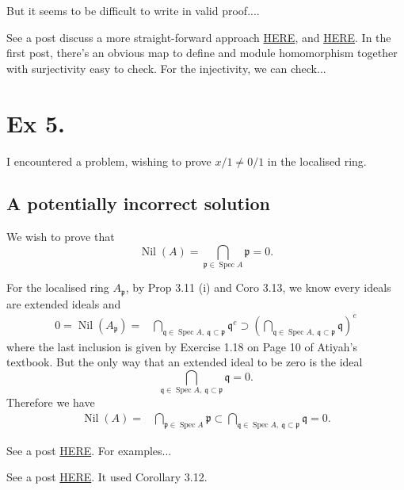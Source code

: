 But it seems to be difficult to write in valid proof....

See a post discuss a more straight-forward approach \href{https://math.stackexchange.com/questions/375454/s-1b-and-t-1b-isomorphic-for-t-fs}{HERE}, and \href{https://math.stackexchange.com/questions/1459441/fa-to-b-ring-homomorphism-s-multiplicatively-closed-subset-of-a-what-does}{HERE}. In the first post, there's an obvious map to define and module homomorphism together with surjectivity easy to check. For the injectivity, we can check... 

\section{Ex 5.}

I encountered a problem, wishing to prove $x/1\neq 0/1$ in the localised ring.


\subsection{A potentially incorrect solution}

We wish to prove that 
$$\operatorname{Nil}(A)=\bigcap_{\mathfrak p\in\operatorname{Spec}A}\mathfrak p=0.$$

For the localised ring $A_{\mathfrak p}$, by Prop 3.11 (i) and Coro 3.13, we know every ideals are extended ideals and 
\begin{align*}
	0=\operatorname{Nil}(A_{\mathfrak p}) =& \bigcap_{\mathfrak q\in\operatorname{Spec}A,~ \mathfrak q\subset \mathfrak p} \mathfrak q^{e}\supset \left(\bigcap_{\mathfrak q\in\operatorname{Spec}A,~ \mathfrak q\subset \mathfrak p} \mathfrak q\right)^e
\end{align*}where the last inclusion is given by Exercise 1.18 on Page 10 of Atiyah's textbook. But the only way that an extended ideal to be zero is the ideal 
$$\bigcap_{\mathfrak q\in\operatorname{Spec}A,~ \mathfrak q\subset \mathfrak p} \mathfrak q=0.$$ Therefore we have 
\begin{align*}
	\operatorname{Nil}(A) =& \bigcap_{\mathfrak p\in\operatorname{Spec}A}\mathfrak p\subset \bigcap_{\mathfrak q\in\operatorname{Spec}A,~ \mathfrak q\subset \mathfrak p} \mathfrak q=0.
\end{align*}

See a post \href{https://math.stackexchange.com/questions/2095939/proof-check-being-reduced-is-a-local-property-atiyah-macdonald-3-5?rq=1}{HERE}. For examples...

See a post \href{https://math.stackexchange.com/questions/2095939/proof-check-being-reduced-is-a-local-property-atiyah-macdonald-3-5?rq=1}{HERE}. It used Corollary 3.12.

